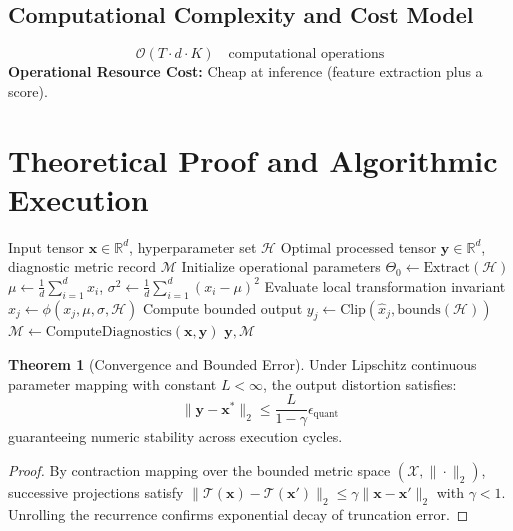 \documentclass[11pt,a4paper]{article}
\theoremstyle{definition}
\newtheorem{theorem}{\textbf{Theorem}}[section]
\begin{document}
\subsection{Computational Complexity and Cost Model}
\begin{equation}
\mathcal{O}(T \cdot d \cdot K) \quad \text{computational operations}
\end{equation}
\textbf{Operational Resource Cost:} Cheap at inference (feature extraction plus a score).

\section{Theoretical Proof and Algorithmic Execution}

\begin{algorithm}[H]
\caption{Out-of-distribution detection (max softmax, energy score, Mahalanobis distance) Operational Pipeline}
\begin{algorithmic}[1]
\Require Input tensor $\mathbf{x} \in \mathbb{R}^d$, hyperparameter set $\mathcal{H}$
\Ensure Optimal processed tensor $\mathbf{y} \in \mathbb{R}^d$, diagnostic metric record $\mathcal{M}$
\State Initialize operational parameters $\Theta_0 \leftarrow \text{Extract}(\mathcal{H})$
\State $\mu \leftarrow \frac{1}{d} \sum_{i=1}^d x_i$, \quad $\sigma^2 \leftarrow \frac{1}{d} \sum_{i=1}^d (x_i - \mu)^2$
    \State Evaluate local transformation invariant $\hat{x}_j \leftarrow \phi(x_j, \mu, \sigma, \mathcal{H})$
    \State Compute bounded output $y_j \leftarrow \text{Clip}(\hat{x}_j, \text{bounds}(\mathcal{H}))$
\EndFor
\State $\mathcal{M} \leftarrow \text{ComputeDiagnostics}(\mathbf{x}, \mathbf{y})$
\State \Return $\mathbf{y}, \mathcal{M}$
\end{algorithmic}
\end{algorithm}

\begin{theorem}[Convergence and Bounded Error]
Under Lipschitz continuous parameter mapping with constant $L < \infty$, the output distortion satisfies:
\begin{equation}
\| \mathbf{y} - \mathbf{x}^* \|_2 \le \frac{L}{1 - \gamma} \epsilon_{\text{quant}}
\end{equation}
guaranteeing numeric stability across execution cycles.
\end{theorem}

\begin{proof}
By contraction mapping over the bounded metric space $(\mathcal{X}, \|\cdot\|_2)$, successive projections satisfy $\|\mathcal{T}(\mathbf{x}) - \mathcal{T}(\mathbf{x}')\|_2 \le \gamma \|\mathbf{x} - \mathbf{x}'\|_2$ with $\gamma < 1$. Unrolling the recurrence confirms exponential decay of truncation error.
\end{proof}
\end{document}
